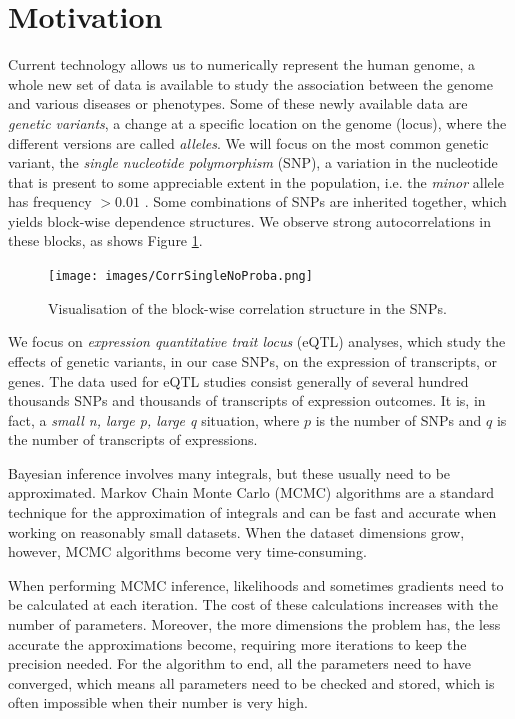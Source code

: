 \documentclass[a4paper, 11pt]{report}
\numberwithin{equation}{chapter}
\begin{document}
\section{Motivation}
Current technology allows us to numerically represent the human genome, a whole new set of data is available to study the association between the genome and various diseases or phenotypes.  Some of these newly available data are \textit{genetic variants}, a change at a specific location on  the genome (locus), where the different versions are called \textit{alleles}. We will focus on the most common genetic variant, the \textit{single nucleotide polymorphism} (SNP), a variation in the nucleotide that is present to some appreciable extent in the population, i.e. the \textit{minor} allele has frequency $> 0.01$ \cite{lewin}. Some combinations of SNPs are inherited together, which yields block-wise dependence structures. We observe strong autocorrelations in these blocks, as shows Figure \ref{fig:corr}.
\begin{figure}
\begin{center}
\texttt{[image: images/CorrSingleNoProba.png]}
\caption{\label{fig:corr} Visualisation of the block-wise correlation structure in the SNPs.}
\end{center}
\end{figure}

We focus on \textit{expression quantitative trait locus} (eQTL) analyses, which study the effects of genetic variants, in our case SNPs, on the expression of transcripts, or genes. The data used for eQTL studies consist generally of several hundred thousands SNPs and thousands of transcripts of expression outcomes. It is, in fact, a \textit{small n, large p, large q} situation, where $p$ is the number of SNPs and $q$ is the number of transcripts of expressions.

Bayesian inference involves many integrals, but these usually need to be approximated. Markov Chain Monte Carlo (MCMC) algorithms are a standard technique for the approximation of integrals and can be fast and accurate when working on reasonably small datasets. When the dataset dimensions grow, however, MCMC algorithms become very time-consuming.

When performing MCMC inference, likelihoods and sometimes gradients need to be calculated at each iteration. The cost of these calculations increases with the number of parameters. Moreover, the more dimensions the problem has, the less accurate the approximations become, requiring more iterations to keep the precision needed. For the algorithm to end, all the parameters need to have converged, which means all parameters need to be checked and stored, which is often impossible when their number is very high.
\end{document}
